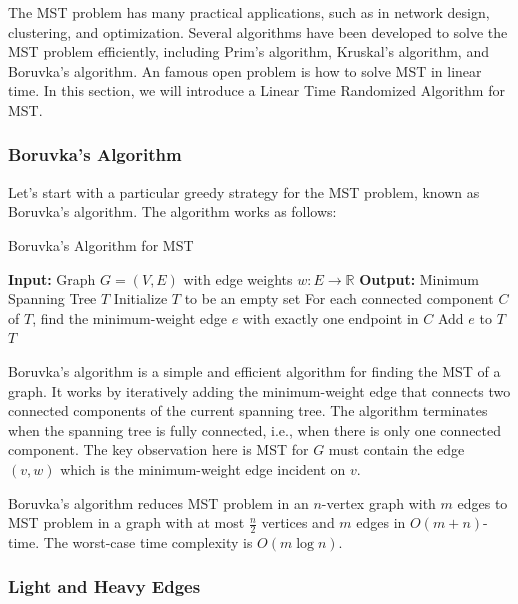 \documentclass[11pt]{article}
\theoremstyle{plain}
\begin{document}
The MST problem has many practical applications, such as in network design, clustering, and optimization. Several algorithms have been developed to solve the MST problem efficiently, including Prim's algorithm, Kruskal's algorithm, and Boruvka's algorithm. An famous open problem is how to solve MST in linear time. In this section, we will introduce a Linear Time Randomized Algorithm for MST.

\subsubsection{Boruvka's Algorithm}

Let's start with a particular greedy strategy for the MST problem, known as Boruvka's algorithm\cite{nevsetvril2001otakar}. The algorithm works as follows:
\newline
\begin{algorithm}
\caption{Boruvka's Algorithm for MST}
\label{alg:boruvka}
\begin{algorithmic}
    \STATE \textbf{Input:} Graph $G=(V,E)$ with edge weights $w:E\to \mathbb{R}$
    \STATE \textbf{Output:} Minimum Spanning Tree $T$
    \STATE Initialize $T$ to be an empty set
        \STATE For each connected component $C$ of $T$, find the minimum-weight edge $e$ with exactly one endpoint in $C$
        \STATE Add $e$ to $T$
    \ENDWHILE
    \RETURN $T$
\end{algorithmic}
\end{algorithm}

Boruvka's algorithm is a simple and efficient algorithm for finding the MST of a graph. It works by iteratively adding the minimum-weight edge that connects two connected components of the current spanning tree. The algorithm terminates when the spanning tree is fully connected, i.e., when there is only one connected component. The key observation here is MST for $G$ must contain the edge $(v,w)$ which is the minimum-weight edge incident on $v$.

Boruvka's algorithm reduces MST problem in an $n$-vertex graph with $m$ edges to MST problem in a graph with at most $\frac{n}{2}$ vertices and $m$ edges in $O(m+n)$-time. The worst-case time complexity is $O(m\log n)$.

\subsubsection{Light and Heavy Edges}
\end{document}
